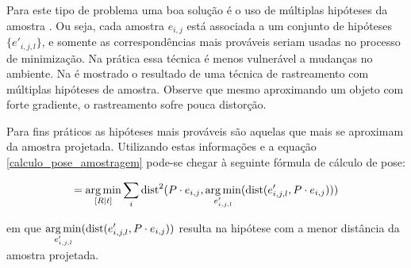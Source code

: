 Para este tipo de problema uma boa solução é o uso de múltiplas hipóteses da amostra \cite{multiplas_hipoteses}. Ou seja, cada amostra $e_{i,j}$ está associada a um conjunto de hipóteses $\{e'_{i,j,l}\}$, e somente as correspondências mais prováveis seriam usadas no processo de minimização. Na prática essa técnica é menos vulnerável a mudanças no ambiente. Na  é mostrado o resultado de uma técnica de rastreamento com múltiplas hipóteses de amostra. Observe que mesmo aproximando um objeto com forte gradiente, o rastreamento sofre pouca distorção.

Para fins práticos as hipóteses mais prováveis são aquelas que mais se aproximam da amostra projetada. Utilizando estas informações e a equação \eqref{calculo_pose_amostragem} pode-se chegar à seguinte fórmula de cálculo de pose:

\begin{equation}
[R | t] = \argmin_{[R | t]} \sum_i \text{dist}^2(P \cdot e_{i,j}, \argmin_{e'_{i,j,l}} (\text{dist} (e'_{i,j,l}, P \cdot e_{i,j})))
\end{equation}

\noindent
em que $\displaystyle \operatorname*{arg\,min}_{e'_{i,j,l}} (\text{dist} (e'_{i,j,l}, P \cdot e_{i,j}))$ resulta na hipótese com a menor distância da amostra projetada.

